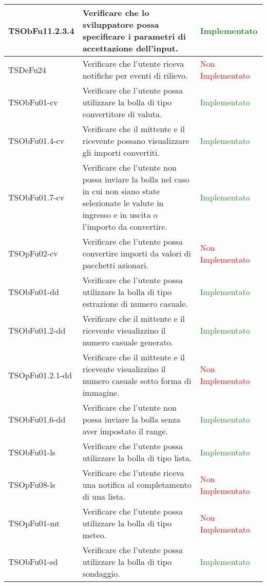 \begin{center}
\begin{longtable}{|
*{1}{>{\centering\arraybackslash}p{2.8cm}|}
*{1}{>{\centering\arraybackslash}p{6cm}|}
*{1}{>{\centering\arraybackslash}p{3cm}|}}
 \hline 
TSObFu11.2.3.4 & Verificare che lo sviluppatore possa specificare i parametri di accettazione dell'input. & \textcolor{ForestGreen}{Implementato}\\
 \hline 
TSDeFu24 & Verificare che l'utente riceva notifiche per eventi di rilievo. & \textcolor{Red}{Non Implementato}\\
 \hline 
TSObFu01-cv & Verificare che l'utente possa utilizzare la bolla di tipo convertitore di valuta. & \textcolor{ForestGreen}{Implementato}\\
 \hline 
TSObFu01.4-cv & Verificare che il mittente e il ricevente possano visualizzare gli importi convertiti. & \textcolor{ForestGreen}{Implementato}\\
 \hline 
TSObFu01.7-cv & Verificare che l'utente non possa inviare la bolla nel caso in cui non siano state selezionate le valute in ingresso e in uscita o l'importo da convertire. & \textcolor{ForestGreen}{Implementato}\\
 \hline 
TSOpFu02-cv & Verificare che l'utente possa convertire importi da valori di pacchetti azionari. & \textcolor{Red}{Non Implementato}\\
 \hline 
TSObFu01-dd & Verificare che l'utente possa utilizzare la bolla di tipo estrazione di numero casuale. & \textcolor{ForestGreen}{Implementato}\\
 \hline 
TSObFu01.2-dd & Verificare che il mittente e il ricevente visualizzino il numero casuale generato. & \textcolor{ForestGreen}{Implementato}\\
 \hline 
TSOpFu01.2.1-dd & Verificare che il mittente e il ricevente visualizzino il numero casuale sotto forma di immagine. & \textcolor{Red}{Non Implementato}\\
 \hline 
TSObFu01.6-dd & Verificare che l'utente non possa inviare la bolla senza aver impostato il range. & \textcolor{ForestGreen}{Implementato}\\
 \hline 
TSObFu01-ls & Verificare che l'utente possa utilizzare la bolla di tipo lista. & \textcolor{ForestGreen}{Implementato}\\
 \hline 
TSOpFu08-ls & Verificare che l'utente riceva una notifica al completamento di una lista. & \textcolor{Red}{Non Implementato}\\
 \hline 
TSOpFu01-mt & Verificare che l'utente possa utilizzare la bolla di tipo meteo. & \textcolor{Red}{Non Implementato}\\
 \hline 
TSObFu01-sd & Verificare che l'utente possa utilizzare la bolla di tipo sondaggio. & \textcolor{ForestGreen}{Implementato}\\

\end{longtable}
\end{center}
